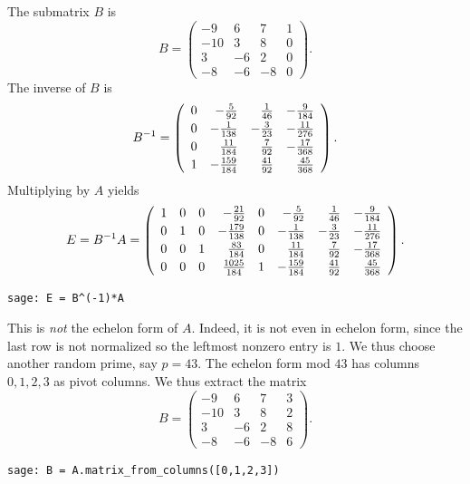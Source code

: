 \begin{example}
The submatrix $B$ is 
$$
  B = \left(\begin{array}{rrrr}
-9&6&7&1\\
-10&3&8&0\\
3&-6&2&0\\
-8&-6&-8&0
\end{array}\right).
$$
The inverse of $B$ is 
$$
 B^{-1} = \left(\begin{array}{rrrr}
0&-\frac{5}{92}&\frac{1}{46}&-\frac{9}{184}\vspace{2pt}\\
0&-\frac{1}{138}&-\frac{3}{23}&-\frac{11}{276}\vspace{2pt}\\
0&\frac{11}{184}&\frac{7}{92}&-\frac{17}{368}\vspace{2pt}\\
1&-\frac{159}{184}&\frac{41}{92}&\frac{45}{368}
\end{array}\right).
$$
Multiplying by $A$ yields
$$
E = B^{-1} A = 
\left(\begin{array}{rrrrrrrr}
1&0&0&-\frac{21}{92}&0&-\frac{5}{92}&\frac{1}{46}&-\frac{9}{184}\vspace{2pt}\\
0&1&0&-\frac{179}{138}&0&-\frac{1}{138}&-\frac{3}{23}&-\frac{11}{276}\vspace{2pt}\\
0&0&1&\frac{83}{184}&0&\frac{11}{184}&\frac{7}{92}&-\frac{17}{368}\vspace{2pt}\\
0&0&0&\frac{1025}{184}&1&-\frac{159}{184}&\frac{41}{92}&\frac{45}{368}
\end{array}\right).
$$
\begin{verbatim}
sage: E = B^(-1)*A
\end{verbatim}%

This is {\em not} the echelon form of $A$.  Indeed, it is not
even in echelon form, since the last row is not
normalized so the leftmost nonzero entry is $1$.
We thus choose another random prime, say $p=43$.
The echelon form mod $43$ has columns $0,1,2,3$ as pivot columns.
We thus extract the matrix
$$
 B = \left(\begin{array}{rrrr}
-9&6&7&3\\
-10&3&8&2\\
3&-6&2&8\\
-8&-6&-8&6
\end{array}\right).
$$
\begin{verbatim}
sage: B = A.matrix_from_columns([0,1,2,3])
\end{verbatim}


\end{example}

